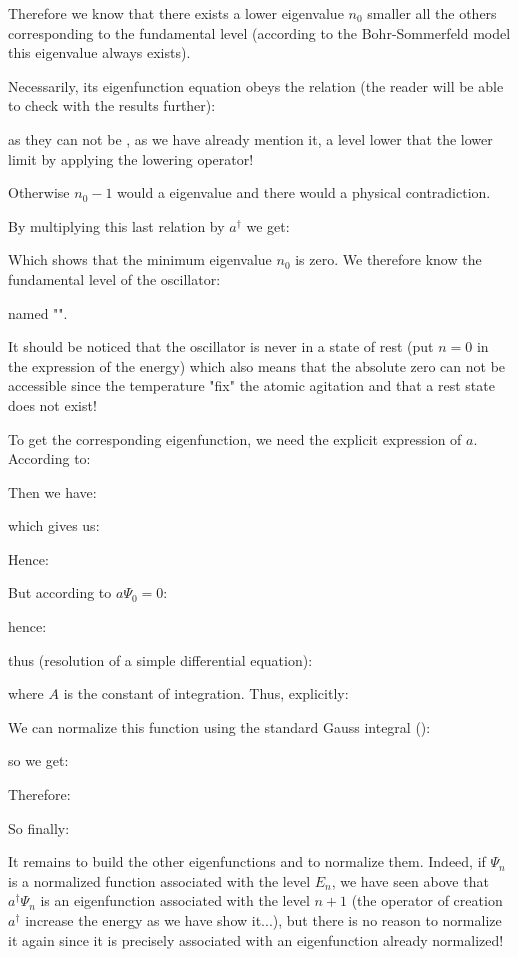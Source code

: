 	Therefore we know that there exists a lower eigenvalue $n_0$ smaller all the others corresponding to the fundamental level (according to the Bohr-Sommerfeld model this eigenvalue always exists).
	
	Necessarily, its eigenfunction equation obeys the relation (the reader will be able to check with the results further):
	
	as they can not be , as we have already mention it, a level lower that the lower limit by applying the lowering operator!
	
	Otherwise $n_0-1$ would a eigenvalue and there would a physical contradiction.

	By multiplying this last relation by $a^\dagger$ we get:
	
	Which shows that the minimum eigenvalue $n_0$ is zero. We therefore know the fundamental level of the oscillator:
	
	named "\label{zero point energy}".
	\begin{tcolorbox}[title=Remark,colframe=black,arc=10pt]
	It should be noticed that the oscillator is never in a state of rest (put $n = 0$ in the expression of the energy) which also means that the absolute zero can not be accessible since the temperature "fix" the atomic agitation and that a rest state does not exist!
	\end{tcolorbox}
	To get the corresponding eigenfunction, we need the explicit expression of $a$. According to:
	
	Then we have:
	
	which gives us:
	
	Hence:
	
	But according to $a\Psi_0=0$:
	
	hence:
	
	thus (resolution of a simple differential equation):
	
	where $A$ is the constant of integration. Thus, explicitly:
	
	We can normalize this function using the standard Gauss integral ():
	
	so we get:
	 
	Therefore:
	
	So finally:
	
	It remains to build the other eigenfunctions and to normalize them. Indeed, if $\Psi_n$ is a normalized function associated with the level $E_n$, we have seen above that $a^\dagger\Psi_n$ is an eigenfunction associated with the level $n+1$ (the operator of creation $a^\dagger$ increase the energy as we have show it...), but there is no reason to normalize it again since it is precisely associated with an eigenfunction already normalized!

